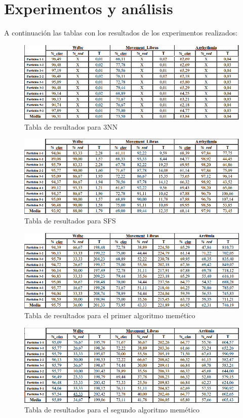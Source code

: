 \section{Experimentos y análisis}
A continuación las tablas con los resultados de los experimentos realizados:
\begin{figure} [H]
\centering
\includegraphics[width=1.0\linewidth]{3NN}
\caption{Tabla de resultados para 3NN}
\label{fig:3NN}
\end{figure}


\begin{figure} [H]
\centering
\includegraphics[width=1.0\linewidth]{SFS}
\caption{Tabla de resultados para SFS}
\label{fig:SFS}
\end{figure}


\begin{figure} [H]
\centering
\includegraphics[width=1.0\linewidth]{AM1}
\caption{Tabla de resultados para el primer algoritmo memético}
\label{fig:AM1}
\end{figure}


\begin{figure} [H]
\centering
\includegraphics[width=1.0\linewidth]{AM2}
\caption{Tabla de resultados para el segundo algoritmo memético}
\label{fig:AM2}
\end{figure}

